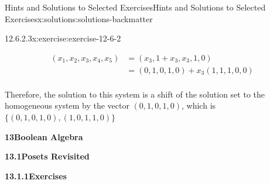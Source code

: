 \documentclass[oneside,10pt,]{book}
\newcommand{\blocktitlefont}{\relax}
\numberwithin{equation}{section}
\begin{document}
\begin{solutions-chapter}{Hints and Solutions to Selected Exercises}{}{Hints and Solutions to Selected Exercises}{}{}{x:solutions:solutions-backmatter}
\begin{divisionsolution}{12.6.2.3}{}{x:exercise:exercise-12-6-2}
\begin{enumerate}[label=(\alph*)]
\begin{equation*}
\begin{split}
(x_1, x_2, x_3, x_4, x_5)& =(x_3,1+x_3,x_3,1,0)\\
& = (0,1,0,1,0) + x_3 (1,1,1,0,0) \\
\end{split}
\end{equation*}
%
\par
Therefore, the solution to this system is a shift of the solution set to the homogeneous system by the vector \((0,1,0,1,0)\), which is \(\{(0,1,0,1,0), (1,0,1,1,0)\}\)%
\end{enumerate}
%
\end{divisionsolution}%
\par\smallskip
\noindent\textbf{\Large{}13\space\textperiodcentered\space{}Boolean Algebra}
\par\smallskip
\par\smallskip
\noindent\textbf{\Large{}13.1\space\textperiodcentered\space{}Posets Revisited}
\par\smallskip
\par\smallskip
\noindent\textbf{\Large{}13.1.1\space\textperiodcentered\space{}Exercises}
\par\smallskip
{}
\end{solutions-chapter}
\end{document}
